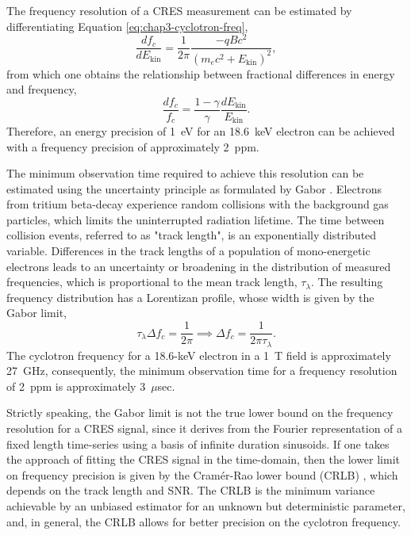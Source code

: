 The frequency resolution of a CRES measurement can be estimated by differentiating Equation \ref{eq:chap3-cyclotron-freq},
\begin{equation}
    \frac{df_c}{dE_\mathrm{kin}} = \frac{1}{2\pi}\frac{-qBc^2}{\left(m_ec^2+E_\mathrm{kin}\right)^2},
\end{equation}
from which one obtains the relationship between fractional differences in energy and frequency,
\begin{equation}
    \frac{df_c}{f_c}=\frac{1-\gamma}{\gamma}\frac{dE_\mathrm{kin}}{E_\mathrm{kin}}.
\end{equation}
Therefore, an energy precision of 1~eV for an 18.6~keV electron can be achieved with a frequency precision of approximately 2~ppm.

The minimum observation time required to achieve this resolution can be estimated using the uncertainty principle as formulated by Gabor \cite{gabor}. Electrons from tritium beta-decay experience random collisions with the background gas particles, which limits the uninterrupted radiation lifetime. The time between collision events, referred to as "track length", is an exponentially distributed variable. Differences in the track lengths of a population of mono-energetic electrons leads to an uncertainty or broadening in the distribution of measured frequencies, which is proportional to the mean track length, $\tau_\lambda$. The resulting frequency distribution has a Lorentizan profile, whose width is given by the Gabor limit,
\begin{equation}
    \tau_\lambda\Delta f_c=\frac{1}{2\pi}\implies\Delta f_c=\frac{1}{2\pi\tau_\lambda}.
\end{equation}
The cyclotron frequency for a 18.6-keV electron in a 1~T field is approximately 27~GHz, consequently, the minimum observation time for a frequency resolution of 2~ppm is approximately 3~$\mu$sec. 

Strictly speaking, the Gabor limit is not the true lower bound on the frequency resolution for a CRES signal, since it derives from the Fourier representation of a fixed length time-series using a basis of infinite duration sinusoids. If one takes the approach of fitting the CRES signal in the time-domain, then the lower limit on frequency precision is given by the Cram\'{e}r-Rao lower bound (CRLB) \cite{nick_viterbi}, which depends on the track length and SNR. The CRLB is the minimum variance achievable by an unbiased estimator for an unknown but deterministic parameter, and, in general, the CRLB allows for better precision on the cyclotron frequency.

